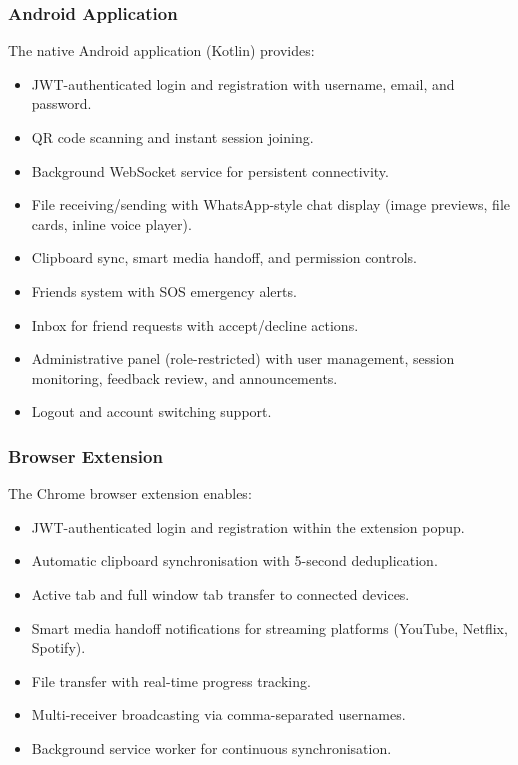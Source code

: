 \documentclass[conference]{IEEEtran}
\begin{document}
\subsubsection{Android Application}

The native Android application (Kotlin) provides:
\begin{itemize}
    \item JWT-authenticated login and registration with username, email, and password.
    \item QR code scanning and instant session joining.
    \item Background WebSocket service for persistent connectivity.
    \item File receiving/sending with WhatsApp-style chat display (image previews, file cards, inline voice player).
    \item Clipboard sync, smart media handoff, and permission controls.
    \item Friends system with SOS emergency alerts.
    \item Inbox for friend requests with accept/decline actions.
    \item Administrative panel (role-restricted) with user management, session monitoring, feedback review, and announcements.
    \item Logout and account switching support.
\end{itemize}

\subsubsection{Browser Extension}

The Chrome browser extension enables:
\begin{itemize}
    \item JWT-authenticated login and registration within the extension popup.
    \item Automatic clipboard synchronisation with 5-second deduplication.
    \item Active tab and full window tab transfer to connected devices.
    \item Smart media handoff notifications for streaming platforms (YouTube, Netflix, Spotify).
    \item File transfer with real-time progress tracking.
    \item Multi-receiver broadcasting via comma-separated usernames.
    \item Background service worker for continuous synchronisation.
\end{itemize}
\end{document}
